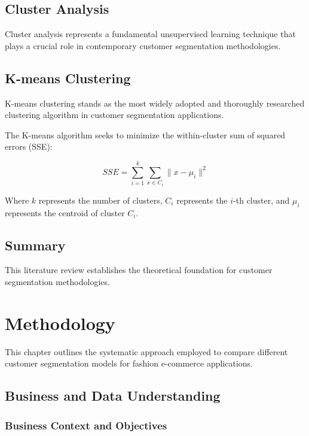 \documentclass[12pt, a4paper, oneside]{report}
\begin{document}
\section{Cluster Analysis}

Cluster analysis represents a fundamental unsupervised learning technique that plays a crucial role in contemporary customer segmentation methodologies.


\section{K-means Clustering}

K-means clustering stands as the most widely adopted and thoroughly researched clustering algorithm in customer segmentation applications.

The K-means algorithm seeks to minimize the within-cluster sum of squared errors (SSE):

\begin{equation}
    SSE = \sum_{i=1}^{k} \sum_{x \in C_i} \|x - \mu_i\|^2
    \label{eq:sse}
\end{equation}

Where $k$ represents the number of clusters, $C_i$ represents the $i$-th cluster, and $\mu_i$ represents the centroid of cluster $C_i$.


\section{Summary}

This literature review establishes the theoretical foundation for customer segmentation methodologies.


\chapter{Methodology}

This chapter outlines the systematic approach employed to compare different customer segmentation models for fashion e-commerce applications.

\section{Business and Data Understanding}

\subsection{Business Context and Objectives}
\end{document}
